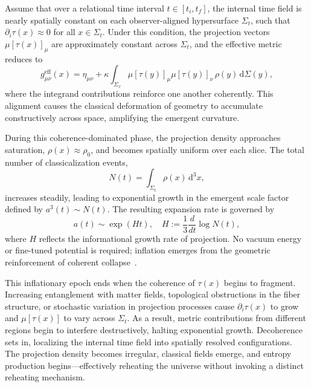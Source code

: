 \documentclass[11pt]{article}
\begin{document}
Assume that over a relational time interval \( t \in [t_i, t_f] \), the internal time field is nearly spatially constant on each observer-aligned hypersurface \( \Sigma_t \), such that \( \partial_i \tau(x) \approx 0 \) for all \( x \in \Sigma_t \). Under this condition, the projection vectors \( \mu[\tau(x)]_\mu \) are approximately constant across \( \Sigma_t \), and the effective metric reduces to
\begin{equation}
g^{\mathrm{eff}}_{\mu\nu}(x) = \eta_{\mu\nu} + \kappa \int_{\Sigma_x} \mu[\tau(y)]_\mu \mu[\tau(y)]_\nu \, \rho(y) \, \mathrm{d}\Sigma(y),
\end{equation}
where the integrand contributions reinforce one another coherently. This alignment causes the classical deformation of geometry to accumulate constructively across space, amplifying the emergent curvature.

During this coherence-dominated phase, the projection density approaches saturation, \( \rho(x) \approx \rho_0 \), and becomes spatially uniform over each slice. The total number of classicalization events,
\begin{equation}
N(t) = \int_{\Sigma_t} \rho(x) \, \mathrm{d}^3x,
\end{equation}
increases steadily, leading to exponential growth in the emergent scale factor defined by \( a^3(t) \sim N(t) \). The resulting expansion rate is governed by
\begin{equation}
a(t) \sim \exp(H t), \quad H := \frac{1}{3} \frac{d}{dt} \log N(t),
\end{equation}
where \( H \) reflects the informational growth rate of projection. No vacuum energy or fine-tuned potential is required; inflation emerges from the geometric reinforcement of coherent collapse~\cite{guth1981inflationary}.

This inflationary epoch ends when the coherence of \( \tau(x) \) begins to fragment. Increasing entanglement with matter fields, topological obstructions in the fiber structure, or stochastic variation in projection processes cause \( \partial_i \tau(x) \) to grow and \( \mu[\tau(x)] \) to vary across \( \Sigma_t \). As a result, metric contributions from different regions begin to interfere destructively, halting exponential growth. Decoherence sets in, localizing the internal time field into spatially resolved configurations. The projection density becomes irregular, classical fields emerge, and entropy production begins—effectively reheating the universe without invoking a distinct reheating mechanism.
\end{document}
